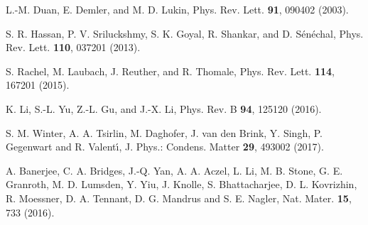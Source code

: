 \documentclass[aps,prb,fleqn,12pt,amsmath,amssymb]{revtex4}
\begin{document}
\begin{thebibliography}{99}
 L.-M. Duan, E. Demler, and M. D. Lukin, Phys. Rev. Lett. {\bf 91}, 090402 (2003).

 S. R. Hassan, P. V. Sriluckshmy, S. K. Goyal, R. Shankar, and D. S{\'e}n{\'e}chal, Phys. Rev. Lett. {\bf 110}, 037201 (2013).

 S. Rachel, M. Laubach, J. Reuther, and R. Thomale, Phys. Rev. Lett. {\bf 114}, 167201 (2015).

 K. Li, S.-L. Yu, Z.-L. Gu, and J.-X. Li, Phys. Rev. B {\bf 94}, 125120 (2016). 

 S. M. Winter, A. A. Tsirlin, M. Daghofer, J. van den Brink, Y. Singh, P. Gegenwart and R. Valent\'{\i}, J. Phys.: Condens. Matter {\bf 29}, 493002 (2017).

 A. Banerjee, C. A. Bridges, J.-Q. Yan, A. A. Aczel, L. Li, M. B. Stone, G. E. Granroth, M. D. Lumsden, Y. Yiu, J. Knolle, S. Bhattacharjee, D. L. Kovrizhin, R. Moessner, D. A. Tennant, D. G. Mandrus and S. E. Nagler, Nat. Mater. {\bf 15}, 733 (2016).

\end{thebibliography}
\end{document}
